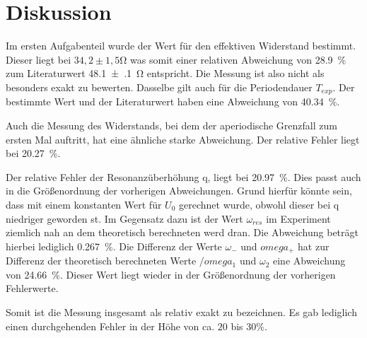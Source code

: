 \section{Diskussion}
\label{sec:Diskussion}

Im ersten Aufgabenteil wurde der Wert für den effektiven Widerstand bestimmt. Dieser liegt bei $34,2 \pm 1,5$\si{\ohm} was somit einer relativen Abweichung von \SI{28.9}{\percent} zum Literaturwert \SI{48.1(1)}{\ohm} entspricht. Die Messung ist also nicht als besonders exakt zu bewerten. Dasselbe gilt auch für die Periodendauer $T_{exp}$. Der bestimmte Wert und der Literaturwert haben eine Abweichung von \SI{40.34}{\percent}.

Auch die Messung des Widerstands, bei dem der aperiodische Grenzfall zum ersten Mal auftritt, hat eine ähnliche starke Abweichung. Der relative Fehler liegt bei \SI{20.27}{\percent}.

Der relative Fehler der Resonanzüberhöhung q, liegt bei \SI{20.97}{\percent}. Dies passt auch in die Größenordnung der vorherigen Abweichungen. Grund hierfür könnte sein, dass mit einem konstanten Wert für $U_0$ gerechnet wurde, obwohl dieser bei q niedriger geworden st. Im Gegensatz dazu ist der Wert $\omega_{res}$ im Experiment ziemlich nah an dem theoretisch berechneten werd dran. Die Abweichung beträgt hierbei lediglich \SI{0.267}{\percent}. Die Differenz der Werte $\omega_{-}$ und $omega_{+}$ hat zur Differenz der theoretisch berechneten Werte $/omega_{1}$ und $\omega_{2}$ eine Abweichung von \SI{24.66}{\percent}. Dieser Wert liegt wieder in der Größenordnung der vorherigen Fehlerwerte. 

Somit ist die Messung insgesamt als relativ exakt zu bezeichnen. Es gab lediglich einen durchgehenden Fehler in der Höhe von ca. $20$ bis $30 \si{\percent}$.  
